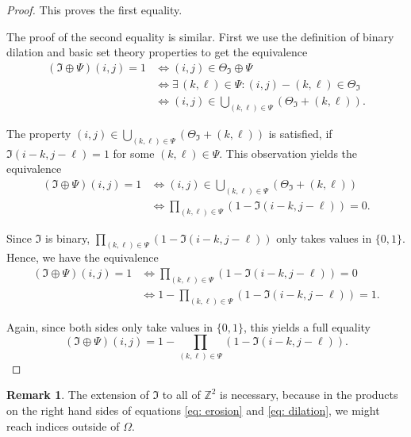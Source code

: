 \documentclass[a4paper,12pt]{article}
\theoremstyle{plain}
\theoremstyle{definition}
\newtheorem{remark}[theorem]{Remark}
\begin{document}
\begin{proof}
	This proves the first equality.
	
	The proof of the second equality is similar. First we use the definition of binary dilation and basic set theory properties to get the equivalence
	\begin{align*}
		(\mathfrak{I} \oplus \Psi)(i, j) = 1 &\Leftrightarrow (i, j) \in \Theta_\mathfrak{I} \oplus \Psi \\
		&\Leftrightarrow \exists \, (k, \ell) \in \Psi: (i, j) - (k, \ell) \in \Theta_\mathfrak{I} \\
		&\Leftrightarrow (i, j) \in \bigcup_{(k, \ell) \in \Psi} ( \Theta_\mathfrak{I} + (k, \ell) ).
	\end{align*}
	
	The property $(i, j) \in \bigcup_{(k, \ell) \in \Psi} ( \Theta_\mathfrak{I} + (k, \ell) )$ is satisfied, if $\mathfrak{I}(i - k, j - \ell) = 1$ for some $(k, \ell) \in \Psi$. This observation yields the equivalence
	\begin{align*}
		(\mathfrak{I} \oplus \Psi)(i, j) = 1 &\Leftrightarrow (i, j) \in \bigcup_{(k, \ell) \in \Psi} ( \Theta_\mathfrak{I} + (k, \ell) ) \\
		&\Leftrightarrow \prod_{(k, \ell) \in \Psi} ( 1 - \mathfrak{I}(i - k, j - \ell) ) = 0.
	\end{align*}
	
	Since $\mathfrak{I}$ is binary, $\prod_{(k, \ell) \in \Psi} ( 1 - \mathfrak{I}(i - k, j - \ell) )$ only takes values in $\{ 0, 1 \}$. Hence, we have the equivalence
	\begin{align*}
		(\mathfrak{I} \oplus \Psi)(i, j) = 1 &\Leftrightarrow \prod_{(k, \ell) \in \Psi} ( 1 - \mathfrak{I}(i - k, j - \ell) ) = 0 \\
		&\Leftrightarrow 1 - \prod_{(k, \ell) \in \Psi} ( 1 - \mathfrak{I}(i - k, j - \ell) ) = 1.
	\end{align*}
	
	Again, since both sides only take values in $\{ 0, 1 \}$, this yields a full equality
	\begin{equation*}
		(\mathfrak{I} \oplus \Psi)(i, j) = 1 - \prod_{(k, \ell) \in \Psi} ( 1 - \mathfrak{I}(i - k, j - \ell) ).
	\end{equation*}
\end{proof}

\begin{remark}
	The extension of $\mathfrak{I}$ to all of $\mathbb{Z}^2$ is necessary, because in the products on the right hand sides of equations \eqref{eq: erosion} and \eqref{eq: dilation}, we might reach indices outside of $\Omega$.
\end{remark}
\end{document}
